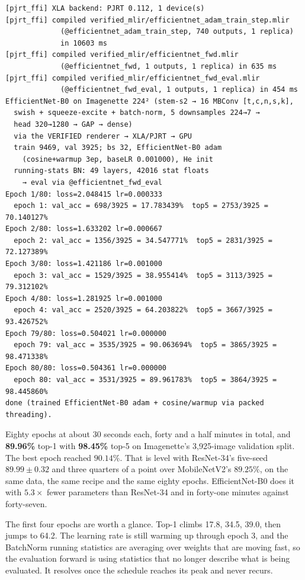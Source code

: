 \begin{verbatim}
[pjrt_ffi] XLA backend: PJRT 0.112, 1 device(s)
[pjrt_ffi] compiled verified_mlir/efficientnet_adam_train_step.mlir
             (@efficientnet_adam_train_step, 740 outputs, 1 replica)
             in 10603 ms
[pjrt_ffi] compiled verified_mlir/efficientnet_fwd.mlir
             (@efficientnet_fwd, 1 outputs, 1 replica) in 635 ms
[pjrt_ffi] compiled verified_mlir/efficientnet_fwd_eval.mlir
             (@efficientnet_fwd_eval, 1 outputs, 1 replica) in 454 ms
EfficientNet-B0 on Imagenette 224² (stem-s2 → 16 MBConv [t,c,n,s,k],
  swish + squeeze-excite + batch-norm, 5 downsamples 224→7 →
  head 320→1280 → GAP → dense)
  via the VERIFIED renderer → XLA/PJRT → GPU
  train 9469, val 3925; bs 32, EfficientNet-B0 adam
    (cosine+warmup 3ep, baseLR 0.001000), He init
  running-stats BN: 49 layers, 42016 stat floats
    → eval via @efficientnet_fwd_eval
Epoch 1/80: loss=2.048415 lr=0.000333
  epoch 1: val_acc = 698/3925 = 17.783439%  top5 = 2753/3925 = 70.140127%
Epoch 2/80: loss=1.633202 lr=0.000667
  epoch 2: val_acc = 1356/3925 = 34.547771%  top5 = 2831/3925 = 72.127389%
Epoch 3/80: loss=1.421186 lr=0.001000
  epoch 3: val_acc = 1529/3925 = 38.955414%  top5 = 3113/3925 = 79.312102%
Epoch 4/80: loss=1.281925 lr=0.001000
  epoch 4: val_acc = 2520/3925 = 64.203822%  top5 = 3667/3925 = 93.426752%
Epoch 79/80: loss=0.504021 lr=0.000000
  epoch 79: val_acc = 3535/3925 = 90.063694%  top5 = 3865/3925 = 98.471338%
Epoch 80/80: loss=0.504361 lr=0.000000
  epoch 80: val_acc = 3531/3925 = 89.961783%  top5 = 3864/3925 = 98.445860%
done (trained EfficientNet-B0 adam + cosine/warmup via packed threading).
\end{verbatim}

Eighty epochs at about 30 seconds each, forty and a half minutes in
total, and \textbf{89.96\%} top-1 with \textbf{98.45\%} top-5 on
Imagenette's 3,925-image validation split. The best epoch reached
$90.14\%$. That is level with ResNet-34's five-seed $89.99 \pm 0.32$ and
three quarters of a point over MobileNetV2's $89.25\%$, on the same data,
the same recipe and the same eighty epochs. EfficientNet-B0 does it with
$5.3\times$ fewer parameters than ResNet-34 and in forty-one minutes
against forty-seven.

The first four epochs are worth a glance. Top-1 climbs 17.8, 34.5, 39.0,
then jumps to 64.2. The learning rate is still warming up through epoch
3, and the BatchNorm running statistics are averaging over weights that
are moving fast, so the evaluation forward is using statistics that no
longer describe what is being evaluated. It resolves once the schedule
reaches its peak and never recurs.

